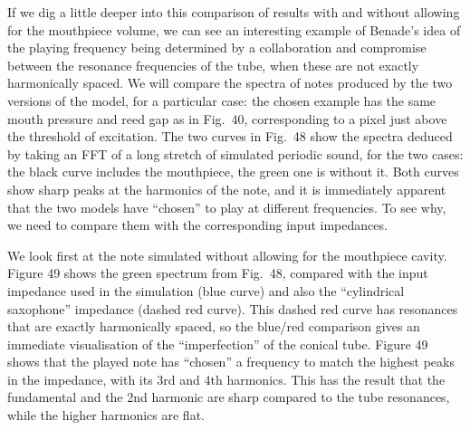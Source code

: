 

  If we dig a little deeper into this comparison of results with and without 
  allowing for the mouthpiece volume, we can see an interesting example of 
  Benade’s idea of the playing frequency being determined by a collaboration 
  and compromise between the resonance frequencies of the tube, when these are 
  not exactly harmonically spaced. We will compare the spectra of notes 
  produced by the two versions of the model, for a particular case: the chosen 
  example has the same mouth pressure and reed gap as in Fig.\ 40, 
  corresponding to a pixel just above the threshold of excitation. The two 
  curves in Fig.\ 48 show the spectra deduced by taking an FFT of a long 
  stretch of simulated periodic sound, for the two cases: the black curve 
  includes the mouthpiece, the green one is without it. Both curves show sharp 
  peaks at the harmonics of the note, and it is immediately apparent that the 
  two models have ``chosen'' to play at different frequencies. To see why, we 
  need to compare them with the corresponding input impedances. 


  We look first at the note simulated without allowing for the mouthpiece 
  cavity. Figure 49 shows the green spectrum from Fig.\ 48, compared with the 
  input impedance used in the simulation (blue curve) and also the 
  ``cylindrical saxophone'' impedance (dashed red curve). This dashed red curve 
  has resonances that are exactly harmonically spaced, so the blue/red 
  comparison gives an immediate visualisation of the “imperfection” of the 
  conical tube. Figure 49 shows that the played note has ``chosen'' a frequency 
  to match the highest peaks in the impedance, with its 3rd and 4th harmonics. 
  This has the result that the fundamental and the 2nd harmonic are sharp 
  compared to the tube resonances, while the higher harmonics are flat. 

